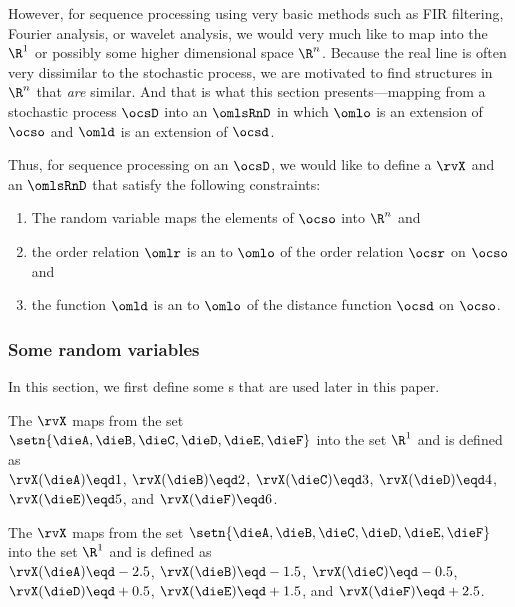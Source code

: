 However, for sequence processing using very basic methods such as FIR filtering, Fourier analysis,
or wavelet analysis,
we would very much like to map into the  $\R^1$ or possibly some higher dimensional space
$\R^n$.
Because the real line is often very dissimilar to the stochastic process,
we are motivated to find structures in $\R^n$ that \emph{are} similar.
And that is what this section presents---mapping from a stochastic process $\ocsD$ 
into an  $\omlsRnD$ in which $\omlo$ is an extension of $\ocso$ and
$\omld$ is an extension of $\ocsd$.

Thus, for sequence processing on an  $\ocsD$, we would like to 
define a  $\rvX$ and an  $\omlsRnD$ 
that satisfy the following constraints: 
\begin{enumerate}
  \item The random variable maps the elements of $\ocso$ into $\R^n$ and
  \item the order relation $\omlr$ is an  to $\omlo$ of the order relation $\ocsr$ on $\ocso$ and
  \item the  function $\omld$ is an  to $\omlo$ of the distance function $\ocsd$ on $\ocso$.
\end{enumerate}

\subsubsection{Some random variables}
In this section, we first define some s  
that are used later in this paper.
\begin{definition}
\label{def:rv_dietrad}
The  $\rvX$ maps from the set %
\\$\setn{\dieA,\dieB,\dieC,\dieD,\dieE,\dieF}$ into the set $\R^1$
and is defined as\footnotemark
\\\indentx
  $\rvX(\dieA)\eqd 1$, 
  $\rvX(\dieB)\eqd 2$, 
  $\rvX(\dieC)\eqd 3$, 
  $\rvX(\dieD)\eqd 4$, 
  $\rvX(\dieE)\eqd 5$, and 
  $\rvX(\dieF)\eqd 6$.
\end{definition}

\begin{definition}
\label{def:rv_diepam}
The  $\rvX$ maps from the set $\setn{\dieA,\dieB,\dieC,\dieD,\dieE,\dieF}$ into the set $\R^1$
and is defined as\footnotemark
\\\indentx
  $\rvX(\dieA)\eqd-2.5$, 
  $\rvX(\dieB)\eqd-1.5$, 
  $\rvX(\dieC)\eqd-0.5$, 
  $\rvX(\dieD)\eqd+0.5$, 
  $\rvX(\dieE)\eqd+1.5$, and 
  $\rvX(\dieF)\eqd+2.5$.
\end{definition}


